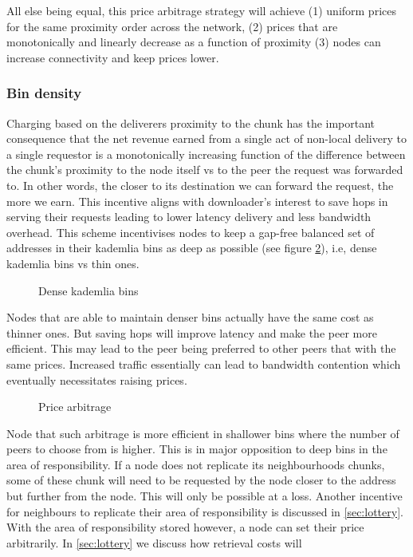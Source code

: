 All else being equal, this price arbitrage strategy will achieve (1) uniform prices for the same proximity order across the network, (2) prices that are monotonically and  linearly decrease as a function  of proximity (3) nodes can increase connectivity and keep prices lower.


\subsubsection{Bin density}

Charging based on the deliverers proximity to the chunk has the important consequence that the net revenue earned from a single act of non-local delivery to a single requestor is a monotonically increasing function of the difference between the chunk's proximity to the node itself vs to the peer the request was forwarded to. In other words, the closer to its destination we can forward the request, the more we earn. This incentive aligns with downloader's interest to save hops in serving their requests leading to lower latency delivery and less bandwidth overhead. This scheme incentivises nodes to keep a gap-free balanced set of addresses in their kademlia bins as deep as possible (see figure \ref{fig:bindensity}), i.e, dense kademlia bins vs thin ones.

\begin{figure}[htbp]
   \centering
   \caption{Dense kademlia bins}
   \label{fig:bindensity}
\end{figure}


Nodes that are able to maintain denser bins actually have the same cost as thinner ones. But saving hops will improve latency and make the peer more efficient. This may lead to the peer being preferred to other peers that with the same prices. Increased traffic essentially can lead to bandwidth contention which eventually necessitates raising prices. 

\begin{figure}[htbp]
   \centering
   \caption{Price arbitrage}
   \label{fig:bindensity}
\end{figure}

Node that such arbitrage is more efficient in shallower bins where the number of peers to choose from is higher. This is in major opposition to deep bins in the area of responsibility. If a node does not replicate its neighbourhoods chunks, some of these chunk will need to be requested by the node closer to the address but further from the node. This will only be possible at a loss. Another incentive for neighbours to replicate their area of responsibility is discussed in \ref{sec:lottery}. With the area of responsibility stored however, a node can set their price arbitrarily. In \ref{sec:lottery} we discuss how retrieval costs will  


